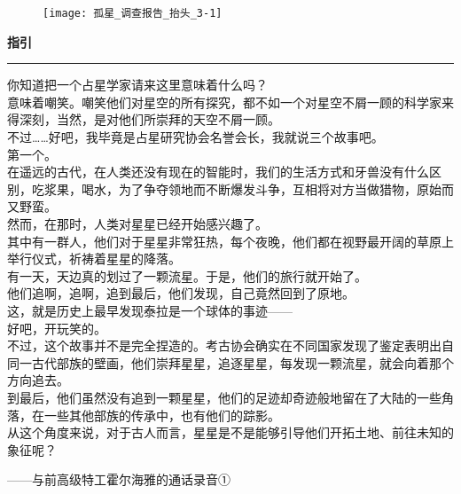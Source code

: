 \documentclass[openany]{book}
\begin{document}
\begin{figure}[h]
    \centering
    \texttt{[image: 孤星\_调查报告\_抬头\_3-1]}
\end{figure}
{\Large\textbf{指引}}\par\noindent\rule{\textwidth}{0.4pt}
你知道把一个占星学家请来这里意味着什么吗？\\
意味着嘲笑。嘲笑他们对星空的所有探究，都不如一个对星空不屑一顾的科学家来得深刻，当然，是对他们所崇拜的天空不屑一顾。\\
不过……好吧，我毕竟是占星研究协会名誉会长，我就说三个故事吧。\\
第一个。\\
在遥远的古代，在人类还没有现在的智能时，我们的生活方式和牙兽没有什么区别，吃浆果，喝水，为了争夺领地而不断爆发斗争，互相将对方当做猎物，原始而又野蛮。\\
然而，在那时，人类对星星已经开始感兴趣了。\\
其中有一群人，他们对于星星非常狂热，每个夜晚，他们都在视野最开阔的草原上举行仪式，祈祷着星星的降落。\\
有一天，天边真的划过了一颗流星。于是，他们的旅行就开始了。\\
他们追啊，追啊，追到最后，他们发现，自己竟然回到了原地。\\
这，就是历史上最早发现泰拉是一个球体的事迹——\\
好吧，开玩笑的。\\
不过，这个故事并不是完全捏造的。考古协会确实在不同国家发现了鉴定表明出自同一古代部族的壁画，他们崇拜星星，追逐星星，每发现一颗流星，就会向着那个方向追去。\\
到最后，他们虽然没有追到一颗星星，他们的足迹却奇迹般地留在了大陆的一些角落，在一些其他部族的传承中，也有他们的踪影。\\
从这个角度来说，对于古人而言，星星是不是能够引导他们开拓土地、前往未知的象征呢？\\
\begin{flushright}——与前高级特工霍尔海雅的通话录音①\end{flushright}

\clearpage
\end{document}
